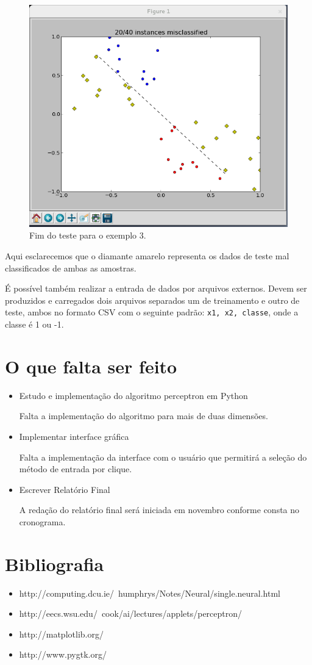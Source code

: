 \documentclass[brazil, a4paper]{article}
\begin{document}
\begin{itemize}
\begin{figure}[!htb]
\centering
\includegraphics[scale=0.25]{ex3-t2.png}
\caption{Fim do teste para o exemplo 3.}
\end{figure}


Aqui esclarecemos que o diamante amarelo representa os dados de teste mal classificados de ambas as amostras.

É possível também realizar a entrada de dados por arquivos externos. Devem ser produzidos e carregados dois arquivos separados um de treinamento e outro de teste, ambos no formato CSV com o seguinte padrão: \texttt{x1, x2, classe}, onde a classe é 1 ou -1.
\end{itemize} 

\section{O que falta ser feito}

\begin{itemize}
\item Estudo e implementação do algoritmo perceptron em Python

Falta a implementação do algoritmo para mais de duas dimensões.

\item Implementar interface gráfica

Falta a implementação da interface com o usuário que permitirá a seleção do método de entrada por clique.
 
\item Escrever Relatório Final

A redação do relatório final será iniciada em novembro conforme consta no cronograma. 

\end{itemize}  

\section{Bibliografia}
\begin{itemize}
\item http://computing.dcu.ie/~humphrys/Notes/Neural/single.neural.html
\item http://eecs.wsu.edu/~cook/ai/lectures/applets/perceptron/
\item http://matplotlib.org/
\item http://www.pygtk.org/
\end{itemize}
\end{document}
